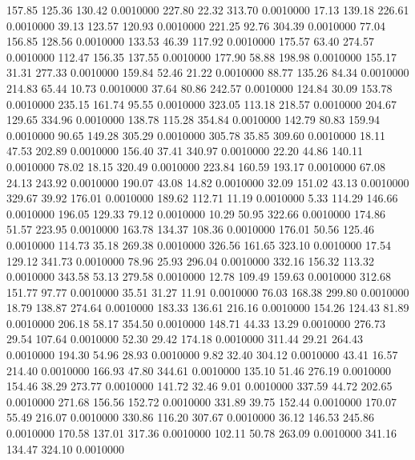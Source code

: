  157.85  125.36  130.42   0.0010000
 227.80   22.32  313.70   0.0010000
  17.13  139.18  226.61   0.0010000
  39.13  123.57  120.93   0.0010000
 221.25   92.76  304.39   0.0010000
  77.04  156.85  128.56   0.0010000
 133.53   46.39  117.92   0.0010000
 175.57   63.40  274.57   0.0010000
 112.47  156.35  137.55   0.0010000
 177.90   58.88  198.98   0.0010000
 155.17   31.31  277.33   0.0010000
 159.84   52.46   21.22   0.0010000
  88.77  135.26   84.34   0.0010000
 214.83   65.44   10.73   0.0010000
  37.64   80.86  242.57   0.0010000
 124.84   30.09  153.78   0.0010000
 235.15  161.74   95.55   0.0010000
 323.05  113.18  218.57   0.0010000
 204.67  129.65  334.96   0.0010000
 138.78  115.28  354.84   0.0010000
 142.79   80.83  159.94   0.0010000
  90.65  149.28  305.29   0.0010000
 305.78   35.85  309.60   0.0010000
  18.11   47.53  202.89   0.0010000
 156.40   37.41  340.97   0.0010000
  22.20   44.86  140.11   0.0010000
  78.02   18.15  320.49   0.0010000
 223.84  160.59  193.17   0.0010000
  67.08   24.13  243.92   0.0010000
 190.07   43.08   14.82   0.0010000
  32.09  151.02   43.13   0.0010000
 329.67   39.92  176.01   0.0010000
 189.62  112.71   11.19   0.0010000
   5.33  114.29  146.66   0.0010000
 196.05  129.33   79.12   0.0010000
  10.29   50.95  322.66   0.0010000
 174.86   51.57  223.95   0.0010000
 163.78  134.37  108.36   0.0010000
 176.01   50.56  125.46   0.0010000
 114.73   35.18  269.38   0.0010000
 326.56  161.65  323.10   0.0010000
  17.54  129.12  341.73   0.0010000
  78.96   25.93  296.04   0.0010000
 332.16  156.32  113.32   0.0010000
 343.58   53.13  279.58   0.0010000
  12.78  109.49  159.63   0.0010000
 312.68  151.77   97.77   0.0010000
  35.51   31.27   11.91   0.0010000
  76.03  168.38  299.80   0.0010000
  18.79  138.87  274.64   0.0010000
 183.33  136.61  216.16   0.0010000
 154.26  124.43   81.89   0.0010000
 206.18   58.17  354.50   0.0010000
 148.71   44.33   13.29   0.0010000
 276.73   29.54  107.64   0.0010000
  52.30   29.42  174.18   0.0010000
 311.44   29.21  264.43   0.0010000
 194.30   54.96   28.93   0.0010000
   9.82   32.40  304.12   0.0010000
  43.41   16.57  214.40   0.0010000
 166.93   47.80  344.61   0.0010000
 135.10   51.46  276.19   0.0010000
 154.46   38.29  273.77   0.0010000
 141.72   32.46    9.01   0.0010000
 337.59   44.72  202.65   0.0010000
 271.68  156.56  152.72   0.0010000
 331.89   39.75  152.44   0.0010000
 170.07   55.49  216.07   0.0010000
 330.86  116.20  307.67   0.0010000
  36.12  146.53  245.86   0.0010000
 170.58  137.01  317.36   0.0010000
 102.11   50.78  263.09   0.0010000
 341.16  134.47  324.10   0.0010000
